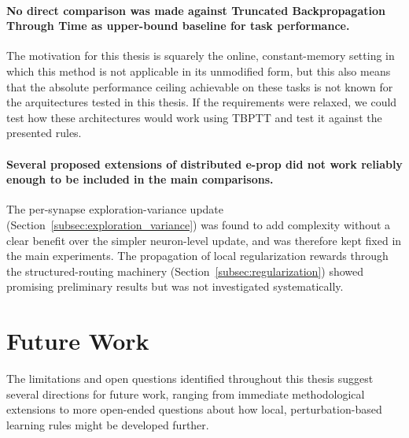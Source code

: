 \paragraph{No direct comparison was made against Truncated Backpropagation Through
Time as upper-bound baseline for task
performance.} The motivation for this thesis is squarely the online,
constant-memory setting in which this method is not applicable
in its unmodified form, but this also means that the absolute
performance ceiling achievable on these tasks is not known for the arquitectures
tested in this thesis. If the requirements were relaxed, 
we could test how these architectures would work using TBPTT and test it against 
the presented rules.

\paragraph{Several proposed extensions of distributed e-prop did not work
reliably enough to be included in the main comparisons.} The per-synapse
exploration-variance update (Section~\ref{subsec:exploration_variance}) was
found to add complexity without a clear benefit over the simpler
neuron-level update, and was therefore kept fixed in the main
experiments. The propagation of local regularization rewards through the
structured-routing machinery (Section~\ref{subsec:regularization}) showed
promising preliminary results but was not investigated systematically.

\section{Future Work}
\label{sec:future_work}

The limitations and open questions identified throughout this thesis
suggest several directions for future work, ranging from immediate
methodological extensions to more open-ended questions about how local,
perturbation-based learning rules might be developed further.

